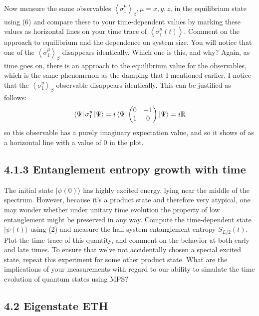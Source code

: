 \documentclass[12pt]{article}
\begin{document}

Now measure the same observables $\left\langle\sigma_{1}^{\mu}\right\rangle_{\beta}, \mu=x, y, z$, in the equilibrium state using (6) and compare these to your time-dependent values by marking these values as horizontal lines on your time trace of $\left\langle\sigma_{1}^{\mu}(t)\right\rangle$. Comment on the approach to equilibrium and the dependence on system size. You will notice that one of the $\left\langle\sigma_{1}^{\mu}\right\rangle_{\beta}$ disappears identically. Which one is this, and why?
\newpage
Again, as time goes on, there is an approach to the equilibrium value for the observables, which is the same phenomenon as the damping that I mentioned earlier. I notice that the $\left\langle\sigma_{1}^{y}\right\rangle_{\beta}$ observable disappears identically. This can be justified as follows:
\begin{equation}
\bra{\Psi } \sigma_{1}^{y} \ket{\Psi} = i \bra{\Psi } 
\begin{pmatrix}
0 & -1 \\
1 & 0
\end{pmatrix}
\ket{\Psi} = i \mathbb{R}
\end{equation}
so this observable has a purely imaginary expectation value, and so it shows of as a horizontal line with a value of 0 in the plot.
\subsection*{4.1.3 Entanglement entropy growth with time}
The initial state $|\psi(0)\rangle$ has highly excited energy, lying near the middle of the spectrum. However, because it's a product state and therefore very atypical, one may wonder whether under unitary time evolution the property of low entanglement might be preserved in any way. Compute the time-dependent state $|\psi(t)\rangle$ using (2) and measure the half-system entanglement entropy $S_{L / 2}(t)$. Plot the time trace of this quantity, and comment on the behavior at both early and late times. To ensure that we've not accidentally chosen a special excited state, repeat this experiment for some other product state. What are the implications of your measurements with regard to our ability to simulate the time evolution of quantum states using MPS?

\subsection*{4.2 Eigenstate ETH}
\end{document}
